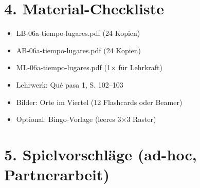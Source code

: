 \documentclass[11pt, a4paper]{article}
\newcommand{\lerngruppengroesse}{24}
\begin{document}

\section*{4. Material-Checkliste}

\begin{materialbox}
\begin{itemize}[label=$\square$]
    \item LB-06a-tiempo-lugares.pdf (\lerngruppengroesse{} Kopien)
    \item AB-06a-tiempo-lugares.pdf (\lerngruppengroesse{} Kopien)
    \item ML-06a-tiempo-lugares.pdf (1× für Lehrkraft)
    \item Lehrwerk: Qué pasa 1, S. 102--103
    \item Bilder: Orte im Viertel (12 Flashcards oder Beamer)
    \item Optional: Bingo-Vorlage (leeres 3×3 Raster)
\end{itemize}
\end{materialbox}


\section*{5. Spielvorschläge (ad-hoc, Partnerarbeit)}
\end{document}

